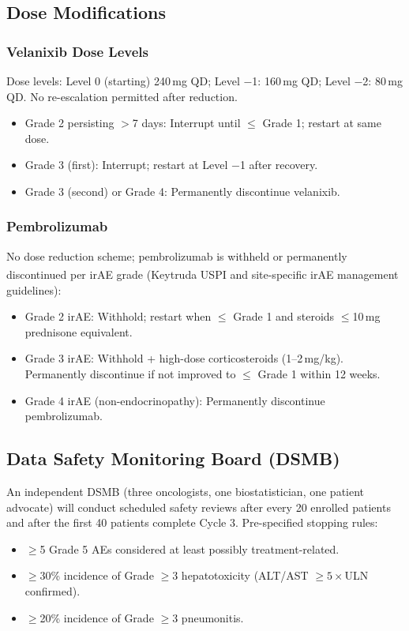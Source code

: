 \subsection{Dose Modifications}

\subsubsection{Velanixib Dose Levels}

Dose levels: Level 0 (starting) 240\,mg QD; Level $-$1: 160\,mg QD; Level $-$2: 80\,mg QD. No re-escalation permitted after reduction.

\begin{itemize}
  \item Grade 2 persisting $>$7 days: Interrupt until $\leq$ Grade 1; restart at same dose.
  \item Grade 3 (first): Interrupt; restart at Level $-$1 after recovery.
  \item Grade 3 (second) or Grade 4: Permanently discontinue velanixib.
\end{itemize}

\subsubsection{Pembrolizumab}

No dose reduction scheme; pembrolizumab is withheld or permanently discontinued per irAE grade (Keytruda\textsuperscript{\textregistered} USPI and site-specific irAE management guidelines):

\begin{itemize}
  \item Grade 2 irAE: Withhold; restart when $\leq$ Grade 1 and steroids $\leq$10\,mg prednisone equivalent.
  \item Grade 3 irAE: Withhold + high-dose corticosteroids (1--2\,mg/kg). Permanently discontinue if not improved to $\leq$ Grade 1 within 12 weeks.
  \item Grade 4 irAE (non-endocrinopathy): Permanently discontinue pembrolizumab.
\end{itemize}

\subsection{Data Safety Monitoring Board (DSMB)}

An independent DSMB (three oncologists, one biostatistician, one patient advocate) will conduct scheduled safety reviews after every 20 enrolled patients and after the first 40 patients complete Cycle 3. Pre-specified stopping rules:

\begin{itemize}
  \item $\geq$5 Grade 5 AEs considered at least possibly treatment-related.
  \item $\geq$30\% incidence of Grade $\geq$3 hepatotoxicity (ALT/AST $\geq 5\times$ULN confirmed).
  \item $\geq$20\% incidence of Grade $\geq$3 pneumonitis.
\end{itemize}

